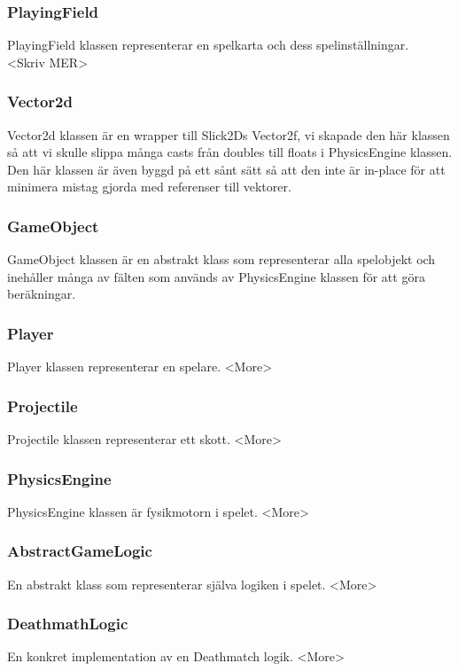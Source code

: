 \subsubsection{PlayingField}
PlayingField klassen representerar en spelkarta och dess spelinställningar.\\
<Skriv MER>\\
\subsubsection{Vector2d}
Vector2d klassen är en wrapper till Slick2Ds Vector2f, vi skapade den här klassen så att vi skulle slippa många casts från doubles till floats i PhysicsEngine klassen. Den här klassen är även byggd på ett sånt sätt så att den inte är in-place för att minimera mistag gjorda med referenser till vektorer.\\
\subsubsection{GameObject}
GameObject klassen är en abstrakt klass som representerar alla spelobjekt och inehåller många av fälten som används av PhysicsEngine klassen för att göra beräkningar.\\
\subsubsection{Player}
Player klassen representerar en spelare. <More>\\
\subsubsection{Projectile}
Projectile klassen representerar ett skott. <More>\\
\subsubsection{PhysicsEngine}
PhysicsEngine klassen är fysikmotorn i spelet. <More>\\
\subsubsection{AbstractGameLogic}
En abstrakt klass som representerar själva logiken i spelet. <More>\\
\subsubsection{DeathmathLogic}
En konkret implementation av en Deathmatch logik. <More>\\
